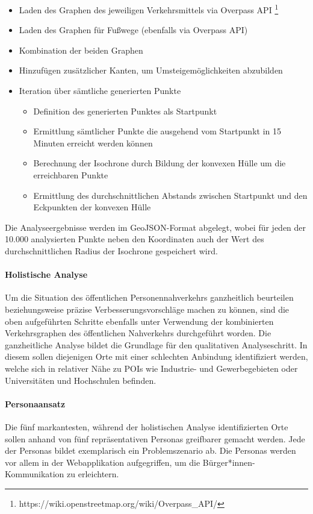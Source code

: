 \begin{itemize}
    \item Laden des Graphen des jeweiligen Verkehrsmittels via Overpass API \footnote{https://wiki.openstreetmap.org/wiki/Overpass\_API/}
    \item Laden des Graphen für Fußwege (ebenfalls via Overpass API)
    \item Kombination der beiden Graphen
    \item Hinzufügen zusätzlicher Kanten, um Umsteigemöglichkeiten abzubilden
    \item Iteration über sämtliche generierten Punkte

    \begin{itemize}
        \item Definition des generierten Punktes als Startpunkt
        \item Ermittlung sämtlicher Punkte die ausgehend vom Startpunkt in 15 Minuten erreicht werden können
        \item Berechnung der Isochrone durch Bildung der konvexen Hülle um die erreichbaren Punkte
        \item Ermittlung des durchschnittlichen Abstands zwischen Startpunkt und den Eckpunkten der konvexen Hülle
    \end{itemize}

\end{itemize}

Die Analyseergebnisse werden im GeoJSON-Format abgelegt, wobei für jeden der 10.000 analysierten Punkte neben den Koordinaten auch der Wert des durchschnittlichen Radius der Isochrone gespeichert wird.

\paragraph*{Holistische Analyse}
\label{holistische_analyse}

Um die Situation des öffentlichen Personennahverkehrs ganzheitlich beurteilen beziehungsweise präzise Verbesserungsvorschläge machen zu können, sind die oben aufgeführten Schritte ebenfalls unter Verwendung der kombinierten Verkehrsgraphen des öffentlichen Nahverkehrs durchgeführt worden. Die ganzheitliche Analyse bildet die Grundlage für den qualitativen Analyseschritt. In diesem sollen diejenigen Orte mit einer schlechten Anbindung identifiziert werden, welche sich in relativer Nähe zu \acp{POI} wie Industrie- und Gewerbegebieten oder Universitäten und Hochschulen befinden.

\paragraph*{Personaansatz}
\label{personaansatz}

Die fünf markantesten, während der holistischen Analyse identifizierten Orte sollen anhand von fünf repräsentativen Personas greifbarer gemacht werden. Jede der Personas bildet exemplarisch ein Problemszenario ab. Die Personas werden vor allem in der Webapplikation aufgegriffen, um die Bürger*innen-Kommunikation zu erleichtern.
